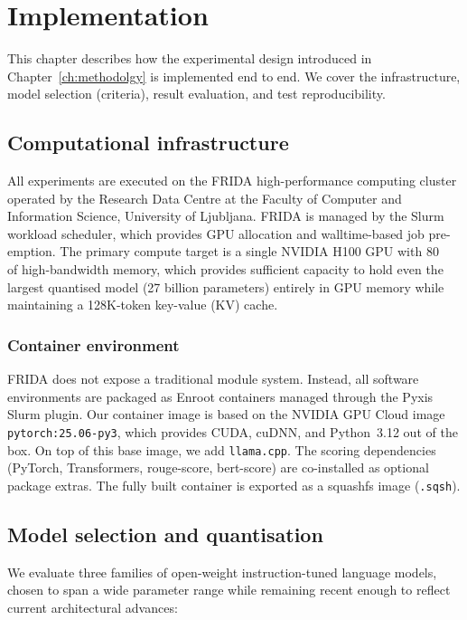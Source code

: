 \chapter{Implementation} \label{ch:implementation}

This chapter describes how the experimental design introduced in Chapter~\ref{ch:methodolgy} is implemented
end to end. We cover the infrastructure, model selection (criteria), result evaluation, and test
reproducibility.

\section{Computational infrastructure}

All experiments are executed on the FRIDA \cite{ulfri_rdc} high-performance computing cluster operated by the
Research Data Centre at the Faculty of Computer and Information Science, University of Ljubljana. FRIDA is
managed by the Slurm workload scheduler, which provides GPU allocation and walltime-based job pre-emption. The
primary compute target is a single NVIDIA H100 GPU with \qty{80}{\giga\byte} of high-bandwidth memory, which
provides sufficient capacity to hold even the largest quantised model (\num{27} billion parameters) entirely
in GPU memory while maintaining a \num{128}K-token key-value (KV) cache.

\subsection{Container environment}

FRIDA does not expose a traditional module system. Instead, all software environments are packaged as Enroot
containers managed through the Pyxis Slurm plugin. Our container image is based on the NVIDIA GPU Cloud image
\texttt{pytorch:25.06-py3}, which provides CUDA, cuDNN, and Python~3.12 out of the box. On top of this base
image, we add \texttt{llama.cpp}. The scoring dependencies (PyTorch, Transformers, rouge-score, bert-score)
are co-installed as optional package extras. The fully built container is exported as a squashfs image (\texttt{.sqsh}).

\section{Model selection and quantisation}

We evaluate three families of open-weight instruction-tuned language models, chosen to span a wide parameter
range while remaining recent enough to reflect current architectural advances:

